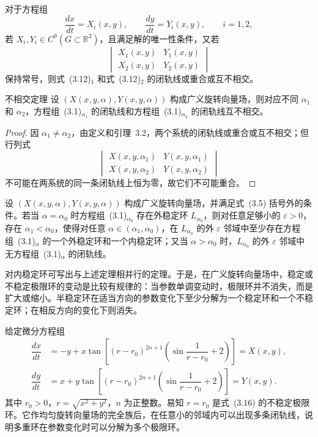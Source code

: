 \begin{lemma}{}{}
对于方程组
\[
 \dfrac{dx}{dt}=X_i(x,y),\qquad\dfrac{dy}{dt}=Y_i(x,y),\qquad i=1,2, \tag{3.12}
\]
若 $X_i,Y_i\in C^0(G\subset\mathbb{R}^2)$，且满足解的唯一性条件，又若
\[
 \begin{vmatrix}
 X_1(x,y)&Y_1(x,y)\\X_2(x,y)&Y_2(x,y)
 \end{vmatrix} \tag{3.13}
\]
保持常号，则式~(3.12)$_1$ 和式~(3.12)$_2$ 的闭轨线或重合或互不相交。
\end{lemma}

\begin{theorem}{不相交定理}{}
设 $(X(x,y,\alpha),Y(x,y,\alpha))$ 构成广义旋转向量场，则对应不同 $\alpha_1$ 和 $\alpha_2$，方程组~(3.1)$_{\alpha_1}$ 的闭轨线和方程组~(3.1)$_{\alpha_2}$ 的闭轨线互不相交。
\end{theorem}

\begin{proof}
因 $\alpha_1\ne\alpha_2$，由定义和引理~3.2，两个系统的闭轨线或重合或互不相交；但行列式
\[
 \begin{vmatrix}
 X(x,y,\alpha_1)&Y(x,y,\alpha_1)\\
 X(x,y,\alpha_2)&Y(x,y,\alpha_2)
 \end{vmatrix} \tag{3.15}
\]
不可能在两系统的同一条闭轨线上恒为零，故它们不可能重合。
\end{proof}

\begin{theorem}{}{}
设 $(X(x,y,\alpha),Y(x,y,\alpha))$ 构成广义旋转向量场，并满足式~(3.5) 括号外的条件。若当 $\alpha=\alpha_0$ 时方程组~(3.1)$_{\alpha_0}$ 存在外稳定环 $L_{\alpha_0}$，则对任意足够小的 $\varepsilon>0$，存在 $\alpha_1<\alpha_0$，使得对任意 $\alpha\in(\alpha_1,\alpha_0)$，在 $L_{\alpha_0}$ 的外 $\varepsilon$ 邻域中至少存在方程组~(3.1)$_\alpha$ 的一个外稳定环和一个内稳定环；又当 $\alpha>\alpha_0$ 时，$L_{\alpha_0}$ 的外 $\varepsilon$ 邻域中无方程组~(3.1)$_\alpha$ 的闭轨线。
\end{theorem}

对内稳定环可写出与上述定理相并行的定理。于是，在广义旋转向量场中，稳定或不稳定极限环的变动是比较有规律的：当参数单调变动时，极限环并不消失，而是扩大或缩小。半稳定环在适当方向的参数变化下至少分解为一个稳定环和一个不稳定环；在相反方向的变化下则消失。

\begin{example}{}{}
给定微分方程组
\begin{equation}
 \begin{aligned}
 \dfrac{dx}{dt}&=-y+x\tan\left[(r-r_0)^{2n+1}\left(\sin\dfrac{1}{r-r_0}+2\right)\right]=X(x,y),\\
 \dfrac{dy}{dt}&=x+y\tan\left[(r-r_0)^{2n+1}\left(\sin\dfrac{1}{r-r_0}+2\right)\right]=Y(x,y).
 \end{aligned}\tag{3.16}
\end{equation}
其中 $r_0>0$，$r=\sqrt{x^2+y^2}$，$n$ 为正整数。易知 $r=r_0$ 是式~(3.16) 的不稳定极限环。它作均匀旋转向量场的完全族后，在任意小的邻域内可以出现多条闭轨线，说明多重环在参数变化时可以分解为多个极限环。
\end{example}

